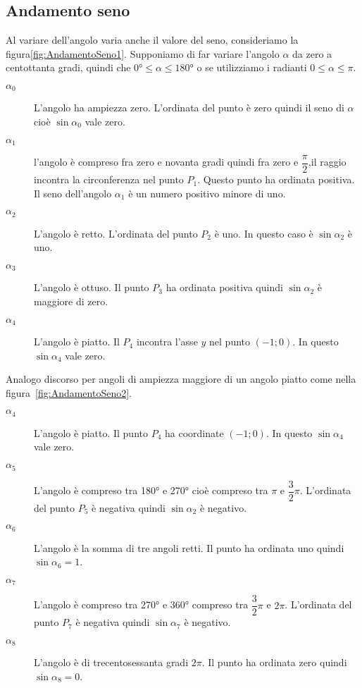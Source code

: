 \subsection{Andamento seno}
\label{subs:AndamentoSeno}
Al variare dell'angolo varia anche il valore del seno, consideriamo la figura\nobs\vref{fig:AndamentoSeno1}. Supponiamo di far variare l'angolo $\alpha$ da zero a centottanta gradi, quindi che $\ang{0}\leq\alpha\leq\ang{180}$ o se utilizziamo i radianti $0\leq\alpha\leq\pi$. 
\begin{description}
	\item[$\alpha_0$] L'angolo ha ampiezza zero. L'ordinata del punto è zero quindi il seno di $\alpha$ cioè $\sin\alpha_0$ vale zero.
	\item [$\alpha_1$] l'angolo è compreso fra zero e novanta gradi  quindi fra zero e $\dfrac{\pi}{2} $,il raggio incontra la circonferenza nel punto $P_1$. Questo punto ha ordinata positiva. Il seno dell'angolo $\alpha_1$ è un numero positivo minore di uno.
	\item [$\alpha_2$] L'angolo è retto. L'ordinata del punto $P_2$ è uno. In questo caso  è   $\sin\alpha_2$ è uno. 
	\item [$\alpha_3$]  L'angolo è ottuso. Il punto $P_3$ ha ordinata positiva quindi $\sin\alpha_2$ è maggiore di zero.
	\item [$\alpha_4$] L'angolo  è  piatto. Il  $P_4$ incontra l'asse $y$ nel punto $(-1;0)$. In questo  $\sin\alpha_4$ vale zero.
\end{description}
Analogo discorso per angoli di ampiezza  maggiore di un angolo  piatto come nella figura~\vref{fig:AndamentoSeno2}.
\begin{description}
	\item [$\alpha_4$] L'angolo è piatto. Il punto  $P_4$ ha coordinate  $(-1;0)$. In questo  $\sin\alpha_4$ vale zero.
	\item [$\alpha_5$] L'angolo è compreso tra \ang{180} e \ang{270} cioè compreso tra $\pi$ e $\dfrac{3}{2}\pi$. L'ordinata del punto $P_5$ è negativa quindi $\sin\alpha_2$ è negativo.
	\item [$\alpha_6$] L'angolo è la somma di tre angoli retti. Il punto ha ordinata uno quindi  $\sin\alpha_6=1$.
	\item [$\alpha_7$] L'angolo è compreso tra \ang{270} e \ang{360} compreso tra $\dfrac{3}{2}\pi$ e $2\pi$. L'ordinata  del punto $P_7$ è negativa quindi $\sin\alpha_7$ è negativo.
	\item [$\alpha_8$] L'angolo è di trecentosessanta gradi $2\pi$. Il punto ha ordinata zero quindi  $\sin\alpha_8=0$.
\end{description}
